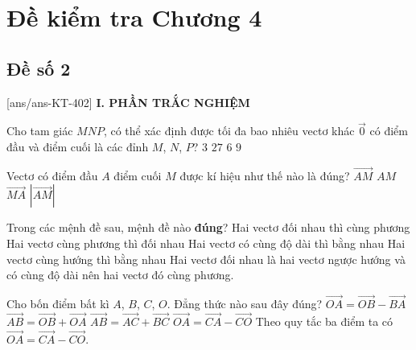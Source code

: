 \section*{Đề kiểm tra Chương 4}
\subsection*{Đề số 2}
\setcounter{ex}{0}\setcounter{bt}{0}
[ans/ans-KT-402]
\noindent\textbf{I. PHẦN TRẮC NGHIỆM}
\begin{ex}%
	Cho tam giác $MNP$, có thể xác định được tối đa bao nhiêu vectơ khác $\overrightarrow{0}$ có điểm đầu và điểm cuối là các đỉnh $M$, $N$, $P$?
	\choice
	{$3$}
	{$27$}
	{\True $6$}
	{$9$}
\end{ex}

\begin{ex}%
	Vectơ có điểm đầu $A$ điểm cuối $M$ được kí hiệu như thế nào là đúng?
	\choice
	{\True $\overrightarrow{AM}$}
	{$AM$}
	{$\overrightarrow{MA}$}
	{$\left|\overrightarrow{AM} \right|$}
\end{ex}

\begin{ex}%
	Trong các mệnh đề sau, mệnh đề nào \textbf{đúng}?
	\choice
	{\True Hai vectơ đối nhau thì cùng phương}
	{Hai vectơ cùng phương thì đối nhau}
	{Hai vectơ có cùng độ dài thì bằng nhau}
	{Hai vectơ cùng hướng thì bằng nhau}
	\loigiai
	{Hai vectơ đối nhau là hai vectơ ngược hướng và có cùng độ dài nên hai vectơ đó cùng phương.}
\end{ex}

\begin{ex}%
	Cho bốn điểm bất kì $A$, $B$, $C$, $O$. Đẳng thức nào sau đây đúng?
	\choice
	{$\overrightarrow{OA}= \overrightarrow{OB}-\overrightarrow{BA}$}
	{$\overrightarrow{AB}= \overrightarrow{OB}+\overrightarrow{OA}$}
	{$\overrightarrow{AB}= \overrightarrow{AC}+\overrightarrow{BC}$}
	{\True $\overrightarrow{OA}= \overrightarrow{CA}-\overrightarrow{CO}$}
	\loigiai
	{
		Theo quy tắc ba điểm ta có $\overrightarrow{OA}= \overrightarrow{CA}-\overrightarrow{CO}$.
	}
\end{ex}

